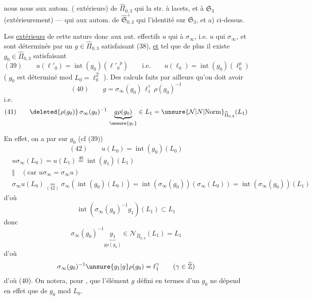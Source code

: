 

 nous nous  aux autom.
( extérieurs) de $\widehat{\Pi}_{0,3}$
qui  la str. à lacets, et  à
$\mathfrak S_3$ (extérieurement)
--- qui  aux autom.
 de
$\widehat{\mathfrak S}_{0,3}^{+}$ qui 
l'identité sur $\mathfrak S_3$,
et  a) ci-dessus. 

Les  \uline{extérieurs} de cette nature
 donc aux aut. effectifs $u$
qui  à $\sigma_\infty$, i.e. $u$
 qui
 $\sigma_\infty$, et sont déterminés par un
$g\in\widehat{\Pi}_{0,3}$ satisfaisant (38), \uline{et} tel que
de plus il existe 
$g_0\in\widehat{\Pi}_{0,3}$ satisfaisant
\[
(39)\qquad
u(\ell'_0)=\operatorname{int}(g_0)({\ell'_0}^{p})
\qquad\text{i.e.}\qquad
u(\ell_0)=\operatorname{int}(g_0)(\ell_0^{p})
\]
( $g_0$ est déterminé mod $L_0=\ell_0^{\widehat{\mathbb Z}}$
\unsure{\ldots}). Des calculs faits par ailleurs 
 qu'on doit avoir
\[
(40)\qquad g=\sigma_\infty(g_0)\,\ell_1^{\gamma}\,\rho(g_0)^{-1}
\]
i.e.
\[
(41)\qquad
\deleted{\rho(g_0)}\,\sigma_\infty(g_0)^{-1}\,
\underbrace{g\rho(g_0)}_{\unsure{g_1}}\in L_1
=\unsure{\mathcal N|N|\mathrm{Norm}}_{\widehat{\Pi}_{0,3}}(L_1)
\]


En effet, on a par  sur $g_0$ (cf (39))
\[
(42)\qquad u(L_0)=\operatorname{int}(g_0)(L_0)
\]
\[
\begin{aligned}
&u\sigma_\infty(L_0)=u(L_1)\overset{40}{=}
  \operatorname{int}(g_1)(L_1)\\
&\Vert\quad(\text{car }u\sigma_\infty=\sigma_\infty u)\\
&\sigma_\infty u(L_0)\underset{(42)}{=}
 \sigma_\infty(\operatorname{int}(g_0)(L_0))
 =\operatorname{int}(\sigma_\infty(g_0))(\sigma_\infty(L_0))
 =\operatorname{int}(\sigma_\infty(g_0))(L_1)
\end{aligned}
\]
d'où
\[
\operatorname{int}(\sigma_\infty(g_0)^{-1}g_1)(L_1)\subset L_1
\]
donc
\[
\sigma_\infty(g_0)^{-1}\underbrace{g_1}_{g\rho(g_0)}
\in \mathcal N_{\widehat{\Pi}_{0,3}}(L_1)=L_1
\]
d'où
\[
\sigma_\infty(g_0)^{-1}\unsure{g_1|g}\rho(g_0)=\ell_1^\gamma
\qquad (\gamma\in\widehat{\mathbb Z})
\]
d'où (40). On notera, pour , que l'élément $g$
défini en termes d'un $g_0$  \margin{$\checkmark$}
ne dépend en effet que de $g_0$ mod $L_0$. 

